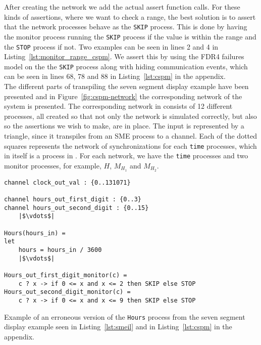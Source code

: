 After creating the network we add the actual assert function calls. For these kinds of assertions, where we want to check a range, the best solution is to assert that the network processes behave as the \texttt{SKIP} process. This is done by having the monitor process running the \texttt{SKIP} process if the value is within the range and the \texttt{STOP} process if not. Two examples can be seen in lines 2 and 4 in Listing~\ref{lst:monitor_range_cspm}. We assert this by using the FDR4 failures model on the the \texttt{SKIP} process along with hiding communication events, which can be seen in lines 68, 78 and 88 in Listing~\ref{lst:cspm} in the appendix.
\\

The different parts of transpiling the seven segment display example have been presented and in Figure~\ref{fig:cspm-network} the corresponding network of the \cspm{} system is presented.
The corresponding network in \cspm{} consists of 12 different processes, all created so that not only the network is simulated correctly, but also so the assertions we wish to make, are in place. The input is represented by a triangle, since it transpiles from an SME process to a \cspm{} channel. Each of the dotted squares represents the network of synchronizations for each \texttt{time} processes, which in itself is a process in \cspm{}. For each network, we have the \texttt{time} processes and two monitor processes, for example, $H$, $M_{H_1}$ and $M_{H_2}$.
\\

\begin{listing}
\begin{verbatim}
channel clock_out_val : {0..131071}

channel hours_out_first_digit : {0..3}
channel hours_out_second_digit : {0..15}
    |$\vdots$|

Hours(hours_in) =
let
    hours = hours_in / 3600
    |$\vdots$|

Hours_out_first_digit_monitor(c) =
    c ? x -> if 0 <= x and x <= 2 then SKIP else STOP
Hours_out_second_digit_monitor(c) =
    c ? x -> if 0 <= x and x <= 9 then SKIP else STOP

\end{verbatim}
\caption{Example of an erroneous version of the \texttt{Hours} process from the \cspm{} seven segment display example seen in Listing~\ref{lst:smeil} and in Listing~\ref{lst:cspm} in the appendix.}
\label{lst:cspm_error}
\end{listing}

